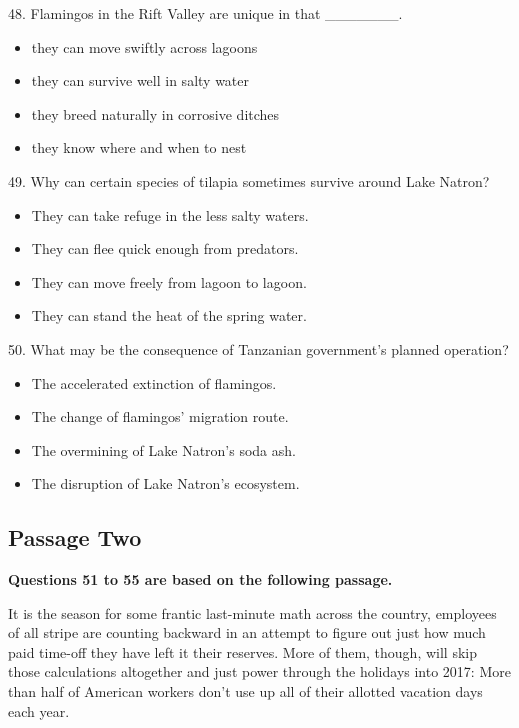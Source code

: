 \documentclass[UTF8,11pt]{ctexart}
\begin{document}
48. Flamingos in the Rift Valley are unique in that \_\_\_\_\_\_\_.


\begin{itemize}[leftmargin=2em,itemsep=.2em,topsep=.4em]\item[A.] they can move swiftly across lagoons
\item[B.] they can survive well in salty water
\item[C.] they breed naturally in corrosive ditches
\item[D.] they know where and when to nest
\end{itemize}

49. Why can certain species of tilapia sometimes survive around Lake Natron?


\begin{itemize}[leftmargin=2em,itemsep=.2em,topsep=.4em]\item[A.] They can take refuge in the less salty waters.
\item[B.] They can flee quick enough from predators.
\item[C.] They can move freely from lagoon to lagoon.
\item[D.] They can stand the heat of the spring water.
\end{itemize}

50. What may be the consequence of Tanzanian government’s planned operation?


\begin{itemize}[leftmargin=2em,itemsep=.2em,topsep=.4em]\item[A.] The accelerated extinction of flamingos.
\item[B.] The change of flamingos’ migration route.
\item[C.] The overmining of Lake Natron’s soda ash.
\item[D.] The disruption of Lake Natron’s ecosystem.
\end{itemize}

\subsection*{\textbf{Passage Two}}


\textbf{Questions 51 to 55 are based on the following passage.}


It is the season for some frantic last-minute math across the country, employees of all stripe are counting backward in an attempt to figure out just how much paid time-off they have left it their reserves. More of them, though, will skip those calculations altogether and just power through the holidays into 2017: More than half of American workers don’t use up all of their allotted vacation days each year.
\end{document}
